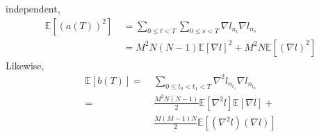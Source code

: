 \documentclass{article}
\theoremstyle{plain}
\theoremstyle{definition}
\newcommand{\expct}[1]{\mathbb{E}\left[#1\right]}
\begin{document}
            independent,
            \begin{align*}
                \expct{(a(T))^2}
                ~&=
                \sum_{0\leq t<T} \sum_{0\leq s<T} \nabla l_{n_t} \nabla l_{n_s} \\
                ~&= 
                M^2N(N-1)   \expct{\nabla l}^2 +
                M^2N        \expct{(\nabla l)^2}
            \end{align*}
            Likewise, 
            \begin{align*}
                \expct{b(T)}
                = 
                ~&\sum_{0\leq t_0 < t_1 < T} \nabla^2 l_{n_{t_1}} \nabla l_{n_{t_0}} \\
                =
                ~&\frac{M^2N(N-1)}{2} \expct{\nabla^2 l} \expct{\nabla l} + \\
                ~&\frac{M(M-1)N}{2}  \expct{(\nabla^2 l) (\nabla l)} 
            \end{align*}
\end{document}

